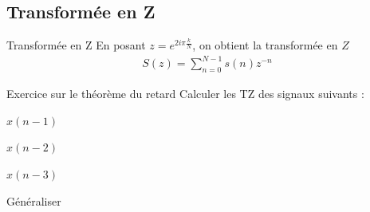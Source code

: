 \documentclass{beamer}
\begin{document}

\subsection{Transformée en Z}
\begin{frame}
\begin{block}{Transformée en Z}
En posant $z=e^{2i\pi \frac{k}{N}}$, on obtient la transformée en $Z$
\begin{align*}
S(z) = \sum_{n=0}^{N-1}s(n)z^{-n}
\end{align*}
\end{block}
\begin{exampleblock}{Exercice sur le théorème du retard}
	\justifying
	Calculer les TZ des signaux suivants :
	\itemize
	\item $x(n-1)$
	\item $x(n-2)$
	\item $x(n-3)$
	\item Généraliser
\end{exampleblock}
\end{frame}
\end{document}
